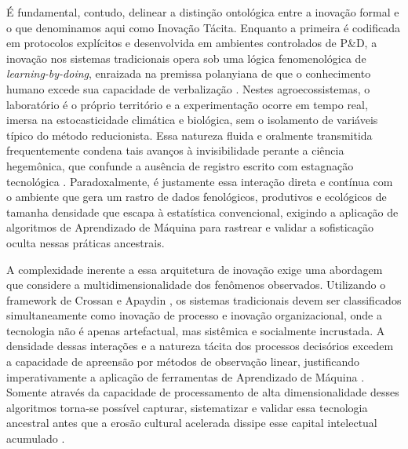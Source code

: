 É fundamental, contudo, delinear a distinção ontológica entre a inovação formal e o que denominamos aqui como Inovação Tácita. Enquanto a primeira é codificada em protocolos explícitos e desenvolvida em ambientes controlados de P\&D, a inovação nos sistemas tradicionais opera sob uma lógica fenomenológica de \textit{learning-by-doing}, enraizada na premissa polanyiana de que o conhecimento humano excede sua capacidade de verbalização  \cite{Klerkx2022FarmerInnovation}. Nestes agroecossistemas, o laboratório é o próprio território e a experimentação ocorre em tempo real, imersa na estocasticidade climática e biológica, sem o isolamento de variáveis típico do método reducionista. Essa natureza fluida e oralmente transmitida frequentemente condena tais avanços à invisibilidade perante a ciência hegemônica, que confunde a ausência de registro escrito com estagnação tecnológica  \cite{Wheeler2021FarmerKnowledge}. Paradoxalmente, é justamente essa interação direta e contínua com o ambiente que gera um rastro de dados fenológicos, produtivos e ecológicos de tamanha densidade que escapa à estatística convencional, exigindo a aplicação de algoritmos de Aprendizado de Máquina para rastrear e validar a sofisticação oculta nessas práticas ancestrais. \cite{Awoke2025,Yifru2025,Rendón-Sandoval2021,Gallegos-Riofrío202161}

A complexidade inerente a essa arquitetura de inovação exige uma abordagem que considere a multidimensionalidade dos fenômenos observados. Utilizando o framework de Crossan e Apaydin  \cite{Crossan2010Innovation}, os sistemas tradicionais devem ser classificados simultaneamente como inovação de processo e inovação organizacional, onde a tecnologia não é apenas artefactual, mas sistêmica e socialmente incrustada. A densidade dessas interações e a natureza tácita dos processos decisórios excedem a capacidade de apreensão por métodos de observação linear, justificando imperativamente a aplicação de ferramentas de Aprendizado de Máquina  \cite{Chen2024AIagrifoodSurvey}. Somente através da capacidade de processamento de alta dimensionalidade desses algoritmos torna-se possível capturar, sistematizar e validar essa tecnologia ancestral antes que a erosão cultural acelerada dissipe esse capital intelectual acumulado  \cite{Wheeler2021FarmerKnowledge}.

